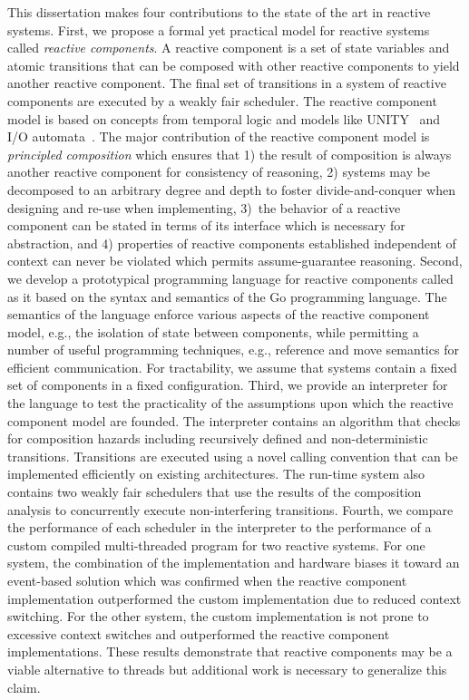 This dissertation makes four contributions to the state of the art in reactive systems.
First, we propose a formal yet practical model for reactive systems called \emph{reactive components}.
A reactive component is a set of state variables and atomic transitions that can be composed with other reactive components to yield another reactive component.
The final set of transitions in a system of reactive components are executed by a weakly fair scheduler.
The reactive component model is based on concepts from temporal logic and models like UNITY~\cite{chandy1989parallel} and I/O automata~\cite{nancy1996distributed}.
The major contribution of the reactive component model is \emph{principled composition} which ensures that 1) the result of composition is always another reactive component for consistency of reasoning, 2) systems may be decomposed to an arbitrary degree and depth to foster divide-and-conquer when designing and re-use when implementing, 3)~the behavior of a reactive component can be stated in terms of its interface which is necessary for abstraction, and 4) properties of reactive components established independent of context can never be violated which permits assume-guarantee reasoning.
Second, we develop a prototypical programming language for reactive components called \rcgo{} as it based on the syntax and semantics of the Go programming language.
The semantics of the language enforce various aspects of the reactive component model, e.g., the isolation of state between components, while permitting a number of useful programming techniques, e.g., reference and move semantics for efficient communication.
For tractability, we assume that systems contain a fixed set of components in a fixed configuration.
Third, we provide an interpreter for the \rcgo{} language to test the practicality of the assumptions upon which the reactive component model are founded.
The interpreter contains an algorithm that checks for composition hazards including recursively defined and non-deterministic transitions.
Transitions are executed using a novel calling convention that can be implemented efficiently on existing architectures.
The run-time system also contains two weakly fair schedulers that use the results of the composition analysis to concurrently execute non-interfering transitions.
Fourth, we compare the performance of each scheduler in the interpreter to the performance of a custom compiled multi-threaded program for two reactive systems.
For one system, the combination of the implementation and hardware biases it toward an event-based solution which was confirmed when the reactive component implementation outperformed the custom implementation due to reduced context switching.
For the other system, the custom implementation is not prone to excessive context switches and outperformed the reactive component implementations.
These results demonstrate that reactive components may be a viable alternative to threads but additional work is necessary to generalize this claim.
